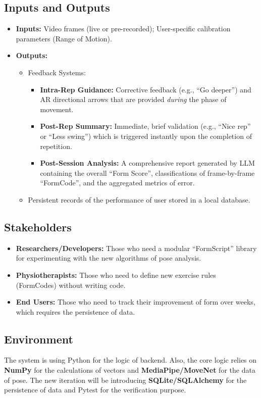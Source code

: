 \documentclass{article}
\begin{document}
\subsection{Inputs and Outputs}
\begin{itemize}
    \item \textbf{Inputs:} Video frames (live or pre-recorded); User-specific calibration parameters (Range of Motion).
    \item \textbf{Outputs:}
    \begin{itemize}
        \item Feedback Systems:
        \begin{itemize}
            \item \textbf{Intra-Rep Guidance:} Corrective feedback (e.g., ``Go deeper'') and AR directional arrows that are provided \textit{during} the phase of movement.
            \item \textbf{Post-Rep Summary:} Immediate, brief validation (e.g., ``Nice rep'' or ``Less swing'') which is triggered instantly upon the completion of repetition.
            \item \textbf{Post-Session Analysis:} A comprehensive report generated by LLM containing the overall ``Form Score'', classifications of frame-by-frame ``FormCode'', and the aggregated metrics of error.
        \end{itemize}
        \item Persistent records of the performance of user stored in a local database.
    \end{itemize}
\end{itemize}

\subsection{Stakeholders}
\begin{itemize}
    \item \textbf{Researchers/Developers:} Those who need a modular ``FormScript'' library for experimenting with the new algorithms of pose analysis.
    \item \textbf{Physiotherapists:} Those who need to define new exercise rules (FormCodes) without writing code.
    \item \textbf{End Users:} Those who need to track their improvement of form over weeks, which requires the persistence of data.
\end{itemize}

\subsection{Environment}
The system is using Python for the logic of backend. Also, the core logic relies on \textbf{NumPy} for the calculations of vectors and \textbf{MediaPipe/MoveNet} for the data of pose. The new iteration will be introducing \textbf{SQLite/SQLAlchemy} for the persistence of data and Pytest for the verification purpose.
\end{document}
